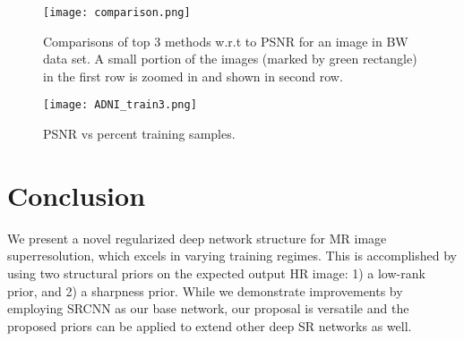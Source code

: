 \documentclass{article}
\def\sqz{\vspace{-3pt}}
\begin{document}
\begin{figure}
 \begin{center}
  \texttt{[image: comparison.png]}
 \end{center}
  \vspace{-.5cm}
  \caption{\small{Comparisons of top 3 methods w.r.t to PSNR for an image in BW data set. A small portion of the images (marked by green rectangle) in the first row is zoomed in and shown in second row.}}  \vspace{-15pt}
  \label{fig:images}
\end{figure}

\begin{figure}[h]
	\begin{center}
		\texttt{[image: ADNI\_train3.png]}
	\end{center}
	\vspace{-.5cm}
	\caption{\small{PSNR vs percent training samples.}}
	\label{fig:trainPlot}
\end{figure}

\vspace{-.5cm}\sqz\sqz
\section{Conclusion}
\label{sec:Conclusion}
\sqz\sqz
We present a novel regularized deep network structure for MR image superresolution, which excels in varying training regimes. This is accomplished by using two structural priors on the expected output HR image: 1) a low-rank prior, and 2) a sharpness prior. While we demonstrate improvements by employing SRCNN \cite{dong2016image} as our base network, our proposal is versatile and the proposed priors can be applied to extend other deep SR networks \cite{kim2016accurate, wang2015deep,timofte2017ntire,kim2016deeply} as well.




\ninept

\end{document}
